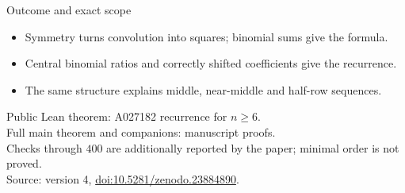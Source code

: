 \documentclass{beamer}
\begin{document}
\begin{frame}{Outcome and exact scope}
\begin{itemize}
\item Symmetry turns convolution into squares; binomial sums give the formula.
\item Central binomial ratios and correctly shifted coefficients give the recurrence.
\item The same structure explains middle, near-middle and half-row sequences.
\end{itemize}
\small
Public Lean theorem: A027182 recurrence for $n\ge6$.\\
Full main theorem and companions: manuscript proofs.\\
Checks through $400$ are additionally reported by the paper; minimal order is not proved.\\
Source: version 4, \href{https://doi.org/10.5281/zenodo.23884890}{doi:10.5281/zenodo.23884890}.
\end{frame}
\appendix
\end{document}
